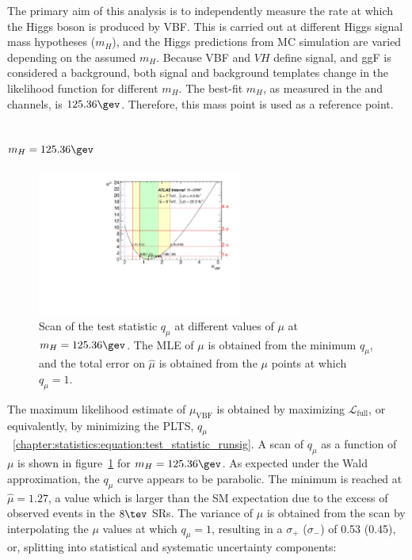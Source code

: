 The primary aim of this analysis is to independently measure the rate
at which the Higgs boson is produced by VBF. This is carried out at
different Higgs signal mass hypotheses ($m_H$), and the Higgs
predictions from MC simulation are varied depending on the assumed $m_H$. Because
VBF and $VH$ define signal, and ggF is considered a background, both
signal and background templates change in the likelihood function for
different $m_H$. The best-fit $m_H$, as measured in the \hzz and \hgg
channels, is $125.36 \gev$. Therefore, this mass point is used as
a reference point.  

\subsection{$m_H = 125.36 \gev$}

\begin{figure}[h]
\centering
\includegraphics[width=0.6\textwidth]{fig/statistics/qmu_v_mu_combined.pdf}
\caption{Scan of the test statistic $q_{\mu}$ at different values of
$\mu$ at $m_H = 125.36 \gev$. The MLE of $\mu$ is obtained from the
minimum $q_{\mu}$, and the total error on $\hat{\mu}$ is obtained from
the $\mu$ points at which $q_{\mu} = 1$.}
\label{chap:analysis:fig:qmu_v_mu}
\end{figure}

The maximum likelihood estimate of $\mu_{\textrm{VBF}}$ is obtained by
maximizing $\mathscr{L}_{\textrm{full}}$, or equivalently, by
minimizing the
PLTS,
$q_{\mu}$~\ref{chapter:statistics:equation:test_statistic_runsig}. A
scan of $q_{\mu}$ as a function of $\mu$ is shown in
figure~\ref{chap:analysis:fig:qmu_v_mu} for $m_H = 125.36 \gev$. As
expected under the Wald approximation, the $q_{\mu}$ curve appears to be
parabolic. The
minimum is reached at $\hat{\mu} = 1.27$, a value which is larger than
the SM expectation due to the excess of observed events in the
$8 \tev$ SRs. The variance of $\mu$ is obtained from the
scan by interpolating the $\mu$ values at which $q_{\mu}=1$, resulting
in a $\sigma_+$ ($\sigma_-$) of 0.53 (0.45), or, splitting into
statistical and systematic uncertainty components:

